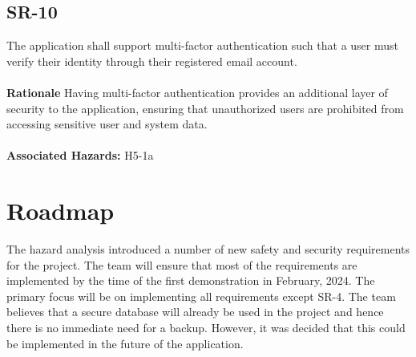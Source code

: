 \documentclass{article}
\begin{document}
\subsection*{SR-10}
The application shall support multi-factor authentication such that a user must verify their identity through their registered email account. \\ \\
\textbf{Rationale} Having multi-factor authentication provides an additional layer of security to the application, ensuring that unauthorized users are prohibited from accessing sensitive user and system data. \\ \\
\textbf{Associated Hazards:} H5-1a

\section{Roadmap}

The hazard analysis introduced a number of new safety and security requirements for the project. The team will ensure that most of the requirements are implemented by the time of the first demonstration in February, 2024. The primary focus will be on implementing all requirements except SR-4. The team believes that a secure database will already be used in the project and hence there is no immediate need for a backup. However, it was decided that this could be implemented in the future of the application.  
\end{document}

